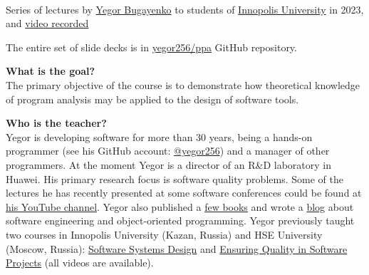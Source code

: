 \documentclass[nobrand,anonymous,nodate,nosecurity]{huawei}
\begin{document}
{\\
Series of lectures by \href{https://www.yegor256.com}{Yegor Bugayenko}
to students of \href{https://innopolis.university/en/}{Innopolis University} in 2023,\\
and \href{https://www.youtube.com/playlist?list=PLaIsQH4uc08wdXIC4utfgMxV_iswE9_Md}{video recorded}}

The entire set of slide decks is in \href{https://github.com/yegor256/ppa}{yegor256/ppa} GitHub repository.

\begin{abstract}
The course is a high-level introduction to program analysis with a
strong emphasis on its practical implementation in the design of programming languages
and code analyzers. Students may listen to this
course if they plan to develop their own programming languages,
compilers, IDEs, static and dynamic analyzers, code refactoring, generating and optimization tools.
The course combines theoretical study with the development of
instruments that analyze source code and automatically modifies it.
\end{abstract}


\textbf{What is the goal?}\\
The primary objective of the course is to demonstrate
how theoretical knowledge of program analysis may be applied to
the design of software tools.

\textbf{Who is the teacher?}\\
Yegor is developing software for more than 30 years, being a hands-on programmer
(see his GitHub account: \href{https://github.com/yegor256}{@yegor256})
and a manager of other programmers. At the moment Yegor is a director
of an R\&D laboratory in Huawei. His primary research focus is
software quality problems. Some of the lectures he has recently presented
at some software conferences could be found at
\href{https://www.youtube.com/channel/UCr9qCdqXLm2SU0BIs6d_68Q}{his YouTube channel}.
Yegor also published a \href{https://www.yegor256.com/books.html}{few books}
and wrote a \href{https://www.yegor256.com/contents.html}{blog} about software engineering
and object-oriented programming.
Yegor previously taught two courses in
Innopolis University (Kazan, Russia)
and HSE University (Moscow, Russia):
\href{https://github.com/yegor256/ssd16}{Software Systems Design}
and
\href{https://github.com/yegor256/eqsp}{Ensuring Quality in Software Projects}
(all videos are available).
\end{document}
